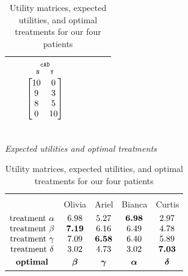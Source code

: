 \documentclass[utf8]{FrontiersinHarvard_mod} %
\renewcommand*{\|}[1][]{\nonscript\:#1\vert\nonscript\:\mathopen{}}
\newcommand*{\cad}{\texttt{cAD}}
\newcommand*{\yes}{\texttt{Y}}
\newcommand*{\no}{\texttt{N}}
\begin{document}
\begin{table}[!h]
\begin{tabular}{lccccccc}
    &&
    $\begin{gathered}
      {\scriptstyle\cad}\\[-2\jot]
      \begin{smallmatrix}
        \no\enspace &\enspace\yes
      \end{smallmatrix}\\[-\jot]
      \begin{bmatrix}10&0\\9&3\\8&5\\0&10\end{bmatrix}\end{gathered}$
    \\[6\jot]
    \hline
  \end{tabular}
\\[1em]
  \textit{Expected utilities and optimal treatments}\\
  \begin{tabular}{lcccc}
    \hline\\[-1.5\jot]
    &{\small Olivia} &{\small Ariel} &{\small Bianca} &{\small Curtis}
    \\[\jot]
    $\begin{matrix}
      \text{treatment }\alpha\\ 
      \text{treatment }\beta\\ 
      \text{treatment }\gamma\\ 
      \text{treatment }\delta\\[\jot]
      \textbf{optimal}
    \end{matrix}$
    &
    $\begin{matrix}6.98\\\bm{7.19}\\7.09\\3.02\\[\jot]\bm{\beta}\end{matrix}$
    &
    $\begin{matrix}5.27\\6.16\\\bm{6.58}\\4.73\\[\jot]\bm{\gamma}\end{matrix}$
    &
    $\begin{matrix}\bm{6.98}\\6.49\\6.40\\3.02\\[\jot]\bm{\alpha}\end{matrix}$
    &
    $\begin{matrix}2.97\\4.78\\5.89\\\bm{7.03}\\[\jot]\bm{\delta}\end{matrix}$
    \\[5\jot]
    \hline
  \end{tabular}
  \caption{Utility matrices, expected utilities, and optimal treatments for our four patients}\label{tab:utilities_patients}
\end{table}
\end{document}
